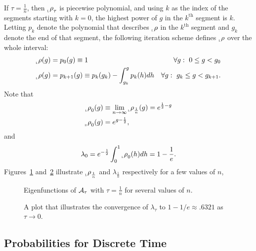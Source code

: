\documentclass[12pt]{article} \usepackage{amsmath,amsfonts}
\newcommand{\Aop}{{\cal A}}
\newcommand{\rightfunction}{{_{_{\scalebox{.4}{R}}} \rho}}
\newcommand{\leftfunction}{{_{_{\scalebox{.4}{L}}} \rho}}
\renewcommand{\th}{^{\text{th}}}
\begin{document}
If $\tau = \frac{1}{n}$, then $\leftfunction_\tau$ is piecewise
polynomial, and using $k$ as the index of the segments starting with
$k=0$, the highest power of $g$ in the $k\th$ segment is $k$.  Letting
$p_k$ denote the polynomial that describes $\leftfunction$ in the
$k\th$ segment and $g_k$ denote the end of that segment, the following
iteration scheme defines $\leftfunction$ over the whole interval:
\begin{align*}
  \leftfunction(g) &= p_0(g) \equiv 1 &\forall g:~ 0\leq g < g_0 \\
  \leftfunction(g) &= p_{k+1}(g) \equiv p_k(g_k) - \int_{g_k}^g p_k(h) dh
                                 &\forall g:~ g_k \leq g < g_{k+1}.
\end{align*}
Note that
\begin{subequations}
  \label{eq:limit_function}
  \begin{align}
    \leftfunction_0(g) &\equiv \lim_{n \rightarrow \infty}
    \leftfunction_{\frac{1}{n}}(g) = e^{\frac{1}{2}-g} \\
    \rightfunction_0(g) &= e^{g-\frac{1}{2}},
  \end{align}
\end{subequations}
and
\begin{equation}
  \label{eq:limit_value}
  \lambda_0 =  e^{-\frac{1}{2}} \int_0^1\leftfunction_0(h) dh = 1 -
  \frac{1}{e}.
\end{equation}
Figures~\ref{fig:eigenfunctions} and~\ref{fig:eigenvalues} illustrate
$\leftfunction_{\frac{1}{n}}$ and $\lambda_{\frac{1}{n}}$ respectively
for a few values of $n$,

\begin{figure*}
  \centering
  \caption{Eigenfunctions of $\Aop_\tau$ with $\tau=\frac{1}{n}$ for
    several values of $n$.}
  \label{fig:eigenfunctions}
\end{figure*}

\begin{figure*}
  \centering
  \caption{A plot that illustrates the convergence of $\lambda_{\tau}$
    to $1-1/e\approx.6321$ as $\tau \rightarrow 0$.}
  \label{fig:eigenvalues}
\end{figure*}

\subsection{Probabilities for Discrete Time}
\label{sec:discrete_t}
\end{document}
